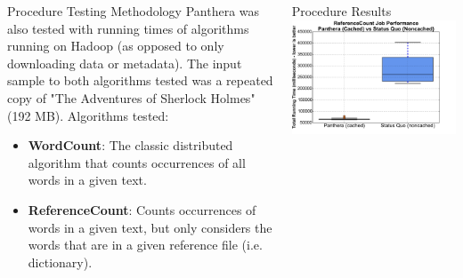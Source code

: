 \documentclass[final]{beamer} %
\begin{document}
\begin{frame}
\begin{columns}[t]
\begin{column}{0.32\textwidth}
	\begin{block}{Procedure Testing Methodology}
	Panthera was also tested with running times of algorithms running on Hadoop (as opposed to only downloading data or metadata). The input sample to both algorithms tested was a repeated copy of "The 
	Adventures of Sherlock Holmes" (192 MB). Algorithms tested: 
	\begin{itemize}
	\item \textbf{WordCount}: The classic distributed algorithm that counts occurrences
	of all words in a given text.
	\item \textbf{ReferenceCount}: Counts occurrences of words in a given text, but 
	only considers the words that are in a given reference file (i.e. dictionary).
	\end{itemize}
	\end{block}
	


	  
      \end{column}
      
      
      \begin{column}{0.32\textwidth}
		\begin{block}{Procedure Results}
		\vspace{1em}
		\includegraphics[scale=1]{assets/v2/refgetter_boxplot.pdf}
		\end{block}
	
	
	

\end{column}
\end{columns}
\end{frame}
\end{document}
